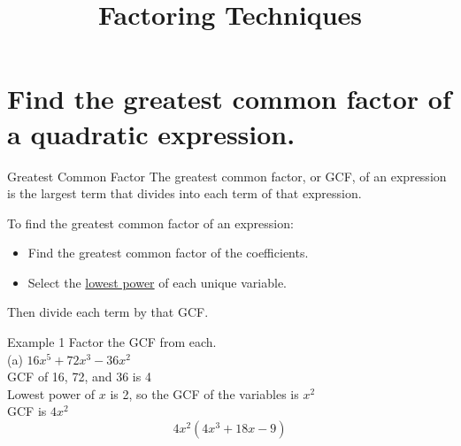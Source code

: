 \documentclass[t]{beamer}
\title{Factoring Techniques}
\author{}
\date{}
\begin{document}
\begin{frame} 
\maketitle
\end{frame}

\section{Find the greatest common factor of a quadratic expression.}

\begin{frame}{Greatest Common Factor}
The \alert{greatest common factor}, or GCF, of an expression is the largest term that divides into each term of that expression.	\newline\\	\pause

To find the greatest common factor of an expression:	\newline\\	\pause
\begin{itemize}
	\item Find the greatest common factor of the coefficients.	\newline\\	\pause
	\item Select the \underline{lowest power} of each unique variable.	\newline\\	\pause
\end{itemize}

Then divide each term by that GCF.
\end{frame}

\begin{frame}{Example 1}
Factor the GCF from each.	\newline\\
(a) \quad $16x^5 + 72x^3 - 36x^2$		\newline\\	\pause
GCF of 16, 72, and 36 is 4	\newline\\	\pause
Lowest power of $x$ is 2, so the GCF of the variables is $x^2$	\newline\\	\pause
GCF is $4x^2$	\newline\\	\pause
\[4x^2\left(4x^3+18x-9\right)\]
\end{frame}
\end{document}
